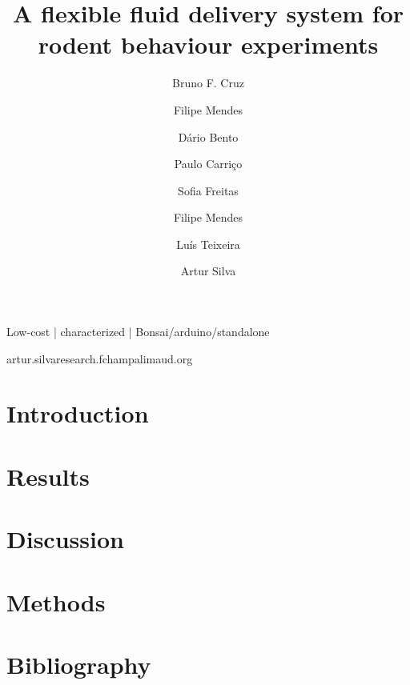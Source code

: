 
\title{A flexible fluid delivery system for rodent behaviour experiments}
\shorttitle{}

\author[1,2]{Bruno F. Cruz}
\author[2]{Filipe Mendes}
\author[2]{Dário Bento}
\author[2]{Paulo Carriço}
\author[2]{Sofia Freitas}
\author[2]{Filipe Mendes}
\author[2]{Luís Teixeira}
\author[1,\Letter]{Artur Silva}
\date{}

\maketitle

\begin{abstract}


\end{abstract}

\begin{keywords}
Low-cost | characterized | Bonsai/arduino/standalone
\end{keywords}

\begin{corrauthor}
artur.silva\at research.fchampalimaud.org
\end{corrauthor}

\section*{Introduction}\label{s:introduction}


\section*{Results}\label{s:results}


\section*{Discussion}\label{s:discussion}


\section*{Methods}\label{s:methods}


\section*{Bibliography}




